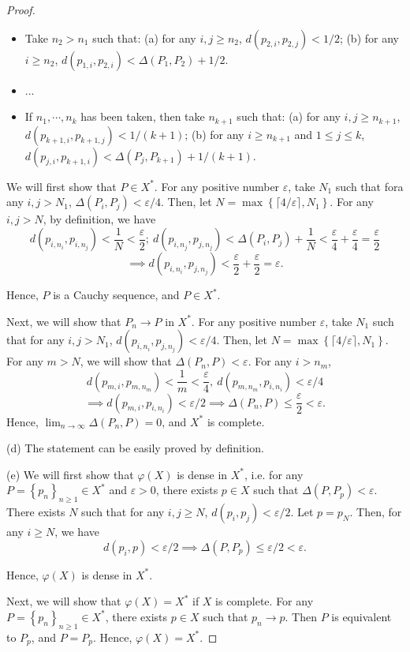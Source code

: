 \documentclass{article}
\begin{document}
\begin{proof}
\begin{itemize}
		\item Take \( n_2>n_1 \) such that: (a) for any \( i,j\ge n_2 \), \( d(p_{2,i},p_{2,j})<1/2 \); (b) for any \( i\ge n_2 \), \( d(p_{1,i},p_{2,i})<\Delta(P_1,P_2)+1/2 \).
		\item ...
		\item If \( n_1,\cdots,n_k \) has been taken, then take \( n_{k+1} \) such that: (a) for any \( i,j\ge n_{k+1} \), \( d(p_{k+1,i},p_{k+1,j})<1/(k+1) \); (b) for any \( i\ge n_{k+1} \) and \( 1\le j\le k \), \( d(p_{j,i},p_{k+1,i})<\Delta(P_j,P_{k+1})+1/(k+1) \).
	\end{itemize}\par
	We will first show that \( P\in X^* \). For any positive number \( \varepsilon \), take \( N_1 \) such that fora any \( i,j>N_1 \), \( \Delta(P_i,P_j)<\varepsilon/4 \). Then, let \( N=\max \left\{\lceil4/\varepsilon\rceil,N_1\right\} \). For any \( i,j>N \), by definition, we have
	\[ d(p_{i,n_i},p_{i,n_j})<\frac{1}{N}<\frac{\varepsilon}{2};\ d(p_{i,n_j},p_{j,n_j})<\Delta(P_i,P_j)+\frac{1}{N}<\frac{\varepsilon}{4}+\frac{\varepsilon}{4}=\frac{\varepsilon}{2} \]
	\[ \implies d(p_{i,n_i},p_{j,n_j})<\frac{\varepsilon}{2}+\frac{\varepsilon}{2}=\varepsilon. \] \par
	Hence, \( P \) is a Cauchy sequence, and \( P\in X^* \).\par
	Next, we will show that \( P_n\to P \) in \( X^* \). For any positive number \( \varepsilon \), take \( N_1 \) such that for any \( i,j>N_1 \), \( d(p_{i,n_i},p_{j,n_j})<\varepsilon/4 \). Then, let \( N=\max \left\{\lceil4/\varepsilon\rceil,N_1\right\} \). For any \( m>N \), we will show that \( \Delta(P_n,P)<\varepsilon \). For any \( i>n_m \), 
	\[ d(p_{m,i},p_{m,n_m})<\frac{1}{m}<\frac{\varepsilon}{4},\ d(p_{m,n_m},p_{i,n_i})<\varepsilon/4 \] 
	\[ \implies d(p_{m,i},p_{i,n_i})<\varepsilon/2\implies \Delta(P_n,P)\le \frac{\varepsilon}{2}<\varepsilon. \] 
	Hence, \( \lim_{n\to\infty}\Delta(P_n,P)=0 \), and \( X^* \) is complete.\par
	(d) The statement can be easily proved by definition.\par
	(e) We will first show that \( \varphi(X) \) is dense in \( X^* \), i.e. for any \( P=\left\{p_n\right\}_{n\ge 1}\in X^* \) and \( \varepsilon>0 \), there exists \( p\in X \) such that \( \Delta(P,P_p)<\varepsilon \). There exists \( N \) such that for any \( i,j\ge N \), \( d(p_i,p_j)<\varepsilon/2 \). Let \( p=p_N \). Then, for any \( i\ge N \), we have
	\[ d(p_i,p)<\varepsilon/2\implies \Delta(P,P_p)\le \varepsilon/2<\varepsilon. \] \par
	Hence, \( \varphi(X) \) is dense in \( X^* \).\par
	Next, we will show that \( \varphi(X)=X^* \) if \( X \) is complete. For any \( P=\left\{p_n\right\}_{n\ge 1}\in X^* \), there exists \( p\in X \) such that \( p_n\to p \). Then \( P \) is equivalent to \( P_p \), and \( P=P_p \). Hence, \( \varphi(X)=X^* \).\par
\end{proof}
\end{document}
